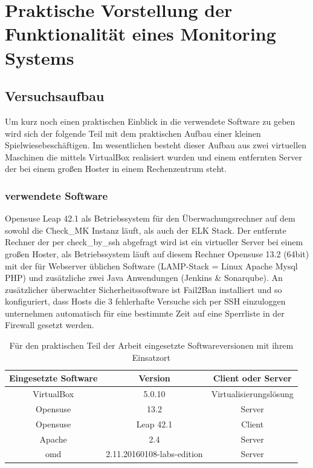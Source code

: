 \documentclass[12pt,a4paper,parskip]{scrreprt}
\begin{document}
	\chapter{Praktische Vorstellung der Funktionalität eines Monitoring Systems}
	\section{Versuchsaufbau}
	Um kurz noch einen praktischen Einblick in die verwendete Software zu geben wird sich der folgende Teil mit dem praktischen Aufbau einer kleinen \glqq Spielwiese\grqq beschäftigen. Im wesentlichen besteht dieser Aufbau aus zwei virtuellen Maschinen die mittels VirtualBox realisiert wurden und einem entfernten Server der bei einem großen Hoster in einem Rechenzentrum steht.
	\subsection{verwendete Software}
	Opensuse Leap 42.1 als Betriebssystem für den Überwachungsrechner auf dem sowohl die Check\_MK Instanz läuft, als auch der ELK Stack. Der entfernte Rechner der per check\_by\_ssh abgefragt wird ist ein virtueller Server bei einem großen Hoster, als Betriebssystem läuft auf diesem Rechner Opensuse 13.2 (64bit) mit der für Webserver üblichen Software (LAMP-Stack = Linux Apache Mysql PHP) und zusätzliche zwei Java Anwendungen (Jenkins \& Sonarqube). An zusätzlicher überwachter Sicherheitssoftware ist Fail2Ban installiert und so konfiguriert, dass Hosts die 3 fehlerhafte Versuche sich per SSH einzuloggen unternehmen automatisch für eine bestimmte Zeit auf eine Sperrliste in der Firewall gesetzt werden. \\
	\begin{table}[h] %
	\begin{center}
	\begin{tabular}{|c|c|c|}
	\hline 
	Eingesetzte Software & Version & Client oder Server \\ 
	\hline 
	VirtualBox & 5.0.10 & Virtualisierungslösung\\
	\hline
	Opensuse & 13.2 & Server\\ 
	\hline 
	Opensuse & Leap 42.1 & Client\\
	\hline
	Apache & 2.4 & Server\\
	\hline
	\acrshort{omd} & 2.11.20160108-labs-edition & Server\\
	\hline
	\end{tabular} 
	\caption[Eingesetzte Softwareversionen]{Für den praktischen Teil der Arbeit eingesetzte Softwareversionen mit ihrem Einsatzort}
	\end{center}
	\end{table}
\end{document}
